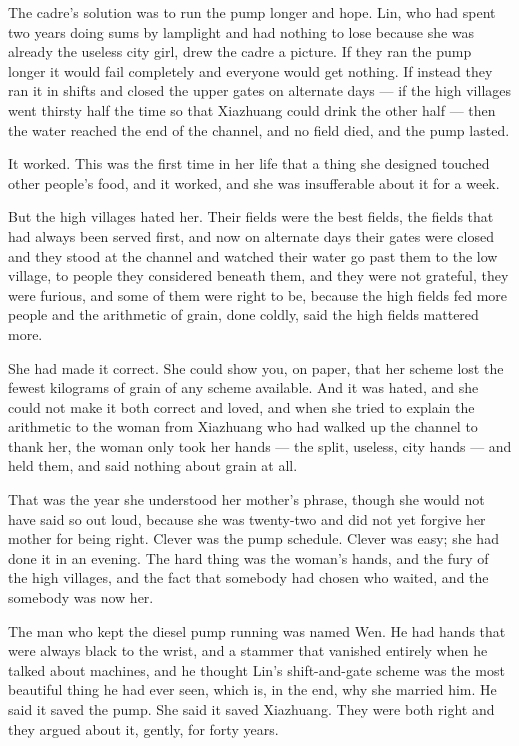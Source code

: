The cadre's solution was to run the pump longer and hope. Lin, who had spent two years doing sums by lamplight and had nothing to lose because she was already the useless city girl, drew the cadre a picture. If they ran the pump longer it would fail completely and everyone would get nothing. If instead they ran it in shifts and closed the upper gates on alternate days --- if the high villages went thirsty half the time so that Xiazhuang could drink the other half --- then the water reached the end of the channel, and no field died, and the pump lasted.

It worked. This was the first time in her life that a thing she designed touched other people's food, and it worked, and she was insufferable about it for a week.

But the high villages hated her. Their fields were the best fields, the fields that had always been served first, and now on alternate days their gates were closed and they stood at the channel and watched their water go past them to the low village, to people they considered beneath them, and they were not grateful, they were furious, and some of them were right to be, because the high fields fed more people and the arithmetic of grain, done coldly, said the high fields mattered more.

She had made it correct. She could show you, on paper, that her scheme lost the fewest kilograms of grain of any scheme available. And it was hated, and she could not make it both correct and loved, and when she tried to explain the arithmetic to the woman from Xiazhuang who had walked up the channel to thank her, the woman only took her hands --- the split, useless, city hands --- and held them, and said nothing about grain at all.

That was the year she understood her mother's phrase, though she would not have said so out loud, because she was twenty-two and did not yet forgive her mother for being right. Clever was the pump schedule. Clever was easy; she had done it in an evening. The hard thing was the woman's hands, and the fury of the high villages, and the fact that somebody had chosen who waited, and the somebody was now her.

The man who kept the diesel pump running was named Wen. He had hands that were always black to the wrist, and a stammer that vanished entirely when he talked about machines, and he thought Lin's shift-and-gate scheme was the most beautiful thing he had ever seen, which is, in the end, why she married him. He said it saved the pump. She said it saved Xiazhuang. They were both right and they argued about it, gently, for forty years.

